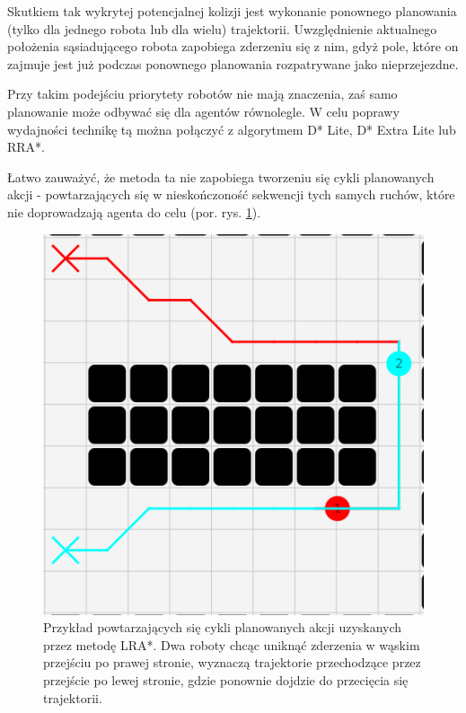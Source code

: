 
Skutkiem tak wykrytej potencjalnej kolizji jest wykonanie ponownego planowania (tylko dla jednego robota lub dla wielu) trajektorii. Uwzględnienie aktualnego położenia sąsiadującego robota zapobiega zderzeniu się z nim, gdyż pole, które on zajmuje jest już podczas ponownego planowania rozpatrywane jako nieprzejezdne.

Przy takim podejściu priorytety robotów nie mają znaczenia, zaś samo planowanie może odbywać się dla agentów równolegle.
W celu poprawy wydajności technikę tą można połączyć z algorytmem D* Lite, D* Extra Lite lub RRA*.

Łatwo zauważyć, że metoda ta nie zapobiega tworzeniu się cykli planowanych akcji - powtarzających się w nieskończoność sekwencji tych samych ruchów, które nie doprowadzają agenta do celu (por. rys. \ref{fig:robopath-lra-cycle}).

\begin{figure}
	\centering
	\includegraphics[width=0.45\columnwidth]{img/robopath/lra-cycle}
	\caption{Przykład powtarzających się cykli planowanych akcji uzyskanych przez metodę LRA*. Dwa roboty chcąc uniknąć zderzenia w wąskim przejściu po prawej stronie, wyznaczą trajektorie przechodzące przez przejście po lewej stronie, gdzie ponownie dojdzie do przecięcia się trajektorii.}
	\label{fig:robopath-lra-cycle}
\end{figure}
